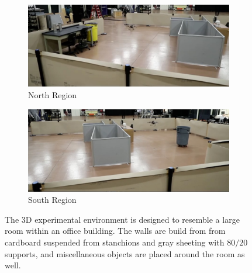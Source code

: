 \documentclass[smallextended]{svjour3}       %
\begin{document}
\begin{figure}[!t]
\centering
    	\begin{subfigure}[t]{0.95\columnwidth}
           	\centering
          	\includegraphics[width=\textwidth]{experiment_north.jpg}
        		\caption{North Region}
    	\end{subfigure}
    	\begin{subfigure}[t]{0.95\columnwidth}
	\vspace*{0.03\columnwidth}
           	\centering
          	\includegraphics[width=\textwidth]{experiment_south.jpg}
        		\caption{South Region}
    	\end{subfigure}
	\caption{The 3D experimental environment is designed to resemble a large room within an office building. The walls are build from from cardboard suspended from stanchions and gray sheeting with $80/20$ supports, and miscellaneous objects are placed around the room as well.}
	\label{fig:exp3DEnvironment}
\end{figure}
\end{document}
